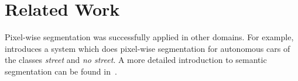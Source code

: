 
\section{Related Work}\label{sec:related-work}

Pixel-wise segmentation was successfully applied in other domains. For example,
\cite{bittel2015pixel} introduces a system which does pixel-wise segmentation
for autonomous cars of the classes \textit{street} and \textit{no street}. A
more detailed introduction to semantic segmentation can be found
in~\cite{thoma2016survey}.
